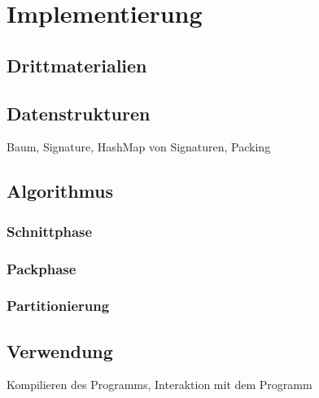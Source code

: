 
\chapter{Implementierung}\label{chapter:implementierung}
\section{Drittmaterialien}
\section{Datenstrukturen}
Baum, Signature, HashMap von Signaturen, Packing
\section{Algorithmus}
\subsection{Schnittphase}
\subsection{Packphase}
\subsection{Partitionierung}
\section{Verwendung}
Kompilieren des Programms, Interaktion mit dem Programm

